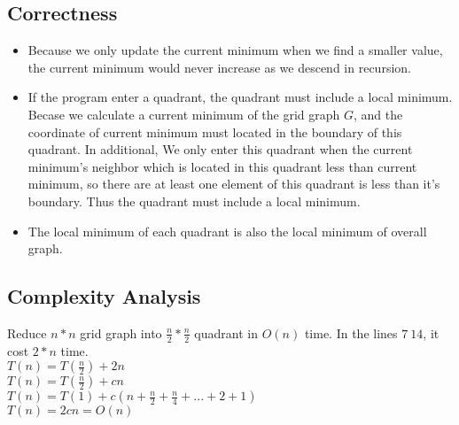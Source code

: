 \documentclass[UTF8,a4paper]{article}
\begin{document}
	\subsection{Correctness}
		\begin{itemize}
	\item Because we only update the current minimum when we find a smaller value, the current minimum would never increase as we descend in recursion. 
	\item If the program enter a quadrant, the quadrant must include a local minimum. \\
		Becase we calculate a current minimum of the grid graph $ G $, and the coordinate of current minimum must located in the boundary of this quadrant. In additional, We only enter this quadrant when the current minimum's neighbor which is located in this quadrant less than current minimum, so there are at least one element of this quadrant is less than it's boundary. Thus the quadrant must include a local minimum.
	\item The local minimum of each quadrant is also the local minimum of overall graph.
		\end{itemize}

	\subsection{Complexity Analysis}
	Reduce $ n*n $ grid graph into $ \frac{n}{2}*\frac{n}{2} $ quadrant in $ O(n) $ time. In the lines $ 7~14 $, it cost $ 2*n $ time.\\
	$ T(n) = T(\frac{n}{2}) + 2n $\\
	$ T(n) = T(\frac{n}{2}) + cn $\\	
	$ T(n) = T(1) + c(n+\frac{n}{2}+\frac{n}{4}+...+2+1) $\\
	$ T(n) = 2cn = O(n) $\\		
\end{document}
